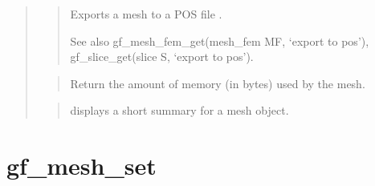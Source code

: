 \documentclass[a4paper,11pt,english]{sphinxmanual}
\begin{document}
\begin{quote}
\begin{quote}

Exports a mesh to a POS file .

See also gf\_mesh\_fem\_get(mesh\_fem MF, ‘export to pos’), gf\_slice\_get(slice S, ‘export to pos’).
\end{quote}

\begin{quote}

Return the amount of memory (in bytes) used by the mesh.
\end{quote}

\begin{quote}

displays a short summary for a mesh object.
\end{quote}
\end{quote}


\section{gf\_mesh\_set}
\label{\detokenize{matlab_octave/cmdref_gf_mesh_set:gf-mesh-set}}\label{\detokenize{matlab_octave/cmdref_gf_mesh_set::doc}}
\end{document}

